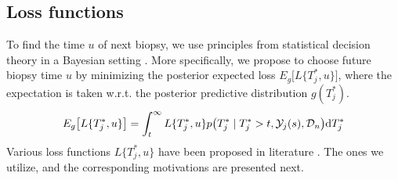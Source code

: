 
\subsection{Loss functions}
\label{subsec : loss_functions}
To find the time $u$ of next biopsy, we use principles from statistical decision theory in a Bayesian setting \citep{bergerDecisionTheory,robertBayesianChoice}. More specifically, we propose to choose future biopsy time $u$ by minimizing the posterior expected loss $E_g\big[L\{T^*_j, u\}\big]$, where the expectation is taken w.r.t. the posterior predictive distribution $g(T^*_j)$. 
\begin{equation*}
E_g\big[L\{T^*_j, u\}\big] = \int_t^\infty L\{T^*_j, u\} p\big(T^*_j \mid T^*_j > t, \mathcal{Y}_j(s), \mathcal{D}_n\big) \mathrm{d} T^*_j
\end{equation*}
Various loss functions $L\{T^*_j, u\}$ have been proposed in literature \citep{robertBayesianChoice}. The ones we utilize, and the corresponding motivations are presented next.

